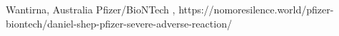           {Wantirna, Australia}
          {}
          {Pfizer/BioNTech}
          {}
          {
            ,
          }
          {https://nomoresilence.world/pfizer-biontech/daniel-shep-pfizer-severe-adverse-reaction/}

